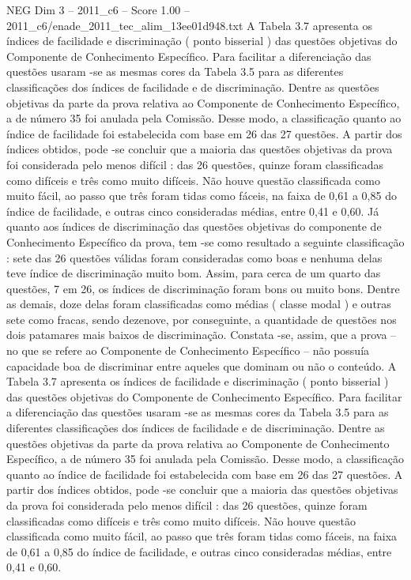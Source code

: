 \begin{textsample}{NEG Dim 3 – 2011\_c6 – Score 1.00 – 2011\_c6/enade\_2011\_tec\_alim\_13ee01d948.txt}
A Tabela 3.7 apresenta os índices de facilidade e discriminação ( ponto bisserial ) das questões objetivas do Componente de Conhecimento Específico.
Para facilitar a diferenciação das questões usaram -se as mesmas cores da Tabela 3.5 para as diferentes classificações dos índices de facilidade e de discriminação.
Dentre as questões objetivas da parte da prova relativa ao Componente de Conhecimento Específico, a de número 35 foi anulada pela Comissão.
Desse modo, a classificação quanto ao índice de facilidade foi estabelecida com base em 26 das 27 questões.
A partir dos índices obtidos, pode -se concluir que a maioria das questões objetivas da prova foi considerada pelo menos difícil : das 26 questões, quinze foram classificadas como difíceis e três como muito difíceis.
Não houve questão classificada como muito fácil, ao passo que três foram tidas como fáceis, na faixa de 0,61 a 0,85 do índice de facilidade, e outras cinco consideradas médias, entre 0,41 e 0,60.
Já quanto aos índices de discriminação das questões objetivas do componente de Conhecimento Específico da prova, tem -se como resultado a seguinte classificação : sete das 26 questões válidas foram consideradas como boas e nenhuma delas teve índice de discriminação muito bom.
Assim, para cerca de um quarto das questões, 7 em 26, os índices de discriminação foram bons ou muito bons.
Dentre as demais, doze delas foram classificadas como médias ( classe modal ) e outras sete como fracas, sendo dezenove, por conseguinte, a quantidade de questões nos dois patamares mais baixos de discriminação.
Constata -se, assim, que a prova – no que se refere ao Componente de Conhecimento Específico – não possuía capacidade boa de discriminar entre aqueles que dominam ou não o conteúdo.
A Tabela 3.7 apresenta os índices de facilidade e discriminação ( ponto bisserial ) das questões objetivas do Componente de Conhecimento Específico.
Para facilitar a diferenciação das questões usaram -se as mesmas cores da Tabela 3.5 para as diferentes classificações dos índices de facilidade e de discriminação.
Dentre as questões objetivas da parte da prova relativa ao Componente de Conhecimento Específico, a de número 35 foi anulada pela Comissão.
Desse modo, a classificação quanto ao índice de facilidade foi estabelecida com base em 26 das 27 questões.
A partir dos índices obtidos, pode -se concluir que a maioria das questões objetivas da prova foi considerada pelo menos difícil : das 26 questões, quinze foram classificadas como difíceis e três como muito difíceis.
Não houve questão classificada como muito fácil, ao passo que três foram tidas como fáceis, na faixa de 0,61 a 0,85 do índice de facilidade, e outras cinco consideradas médias, entre 0,41 e 0,60.

\end{textsample}
